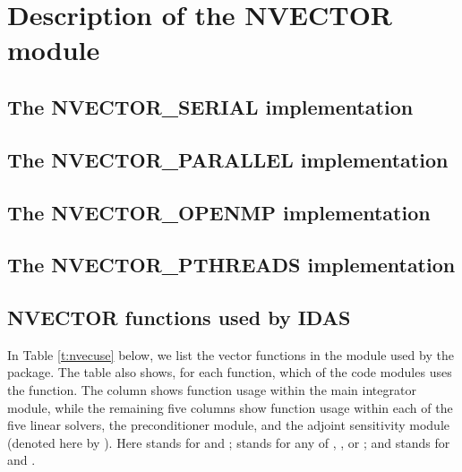 \chapter{Description of the NVECTOR module}\label{s:nvector}


\section{The NVECTOR\_SERIAL implementation}\label{ss:nvec_ser}


\section{The NVECTOR\_PARALLEL implementation}\label{ss:nvec_par}


\section{The NVECTOR\_OPENMP implementation}\label{ss:nvec_openmp}


\section{The NVECTOR\_PTHREADS implementation}\label{ss:nvec_pthreads}


\section{NVECTOR functions used by IDAS}

In Table \ref{t:nvecuse} below, we list the vector functions in the 
{\nvector} module used by the {\idas} package.
The table also shows, for each function, which of the code modules uses
the function. The {\idas} column shows function usage within the main
integrator module, while the remaining five columns show function usage
within each of the five {\idas} linear solvers, the {\idabbdpre}
preconditioner module, and the {\idas} adjoint sensitivity module
(denoted here by {\idaa}).
Here {\idadls} stands for {\idadense} and {\idaband}; {\idaspils} stands
for any of {\idaspgmr}, {\idaspbcg}, or {\idasptfqmr}; and {\idasparse}
stands for {\idaklu} and {\idasuperlumt}.


